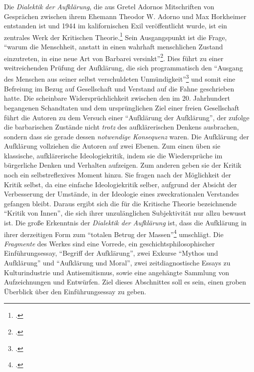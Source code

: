 \documentclass[a4paper, 12pt]{article}
\begin{document}
\begin{onehalfspace}
\noindent Die \emph{Dialektik der Aufklärung}, die aus Gretel Adornos Mitschriften von Gesprächen zwischen ihrem Ehemann Theodor W. Adorno und Max Horkheimer entstanden ist und 1944 im kalifornischen Exil veröffentlicht wurde, ist ein zentrales Werk der Kritischen Theorie.\footnote{\Cite[Vgl.][S. 249]{jaeggi}.} Sein Ausgangspunkt ist die Frage, "`warum die Menschheit, anstatt in einen wahrhaft menschlichen Zustand einzutreten, in eine neue Art von Barbarei versinkt"'\footnote{\Cite[Siehe][S. 1]{dialektik-der-aufklaerung}.}. Dies führt zu einer weitreichenden Prüfung der Aufklärung, die sich programmatisch den "`Ausgang des Menschen aus seiner selbst verschuldeten Unmündigkeit"'\footnote{\Cite[Siehe][S. 481]{kant}.} und somit eine Befreiung im Bezug auf Gesellschaft und Verstand auf die Fahne geschrieben hatte. Die scheinbare Widersprüchlichkeit zwischen den im 20. Jahrhundert begangenen Schandtaten und dem ursprünglichen Ziel einer freien Gesellschaft führt die Autoren zu dem Versuch einer "`Aufklärung der Aufklärung"', der zufolge die barbarischen Zustände nicht \emph{trotz} des aufklärerischen Denkens ausbrachen, sondern dass sie gerade dessen \emph{notwendige Konsequenz} waren. Die Aufklärung der Aufklärung vollziehen die Autoren auf zwei Ebenen. Zum einen üben sie klassische, aufklärerische Ideologiekritik, indem sie die Wiedersprüche im bürgerliche Denken und Verhalten aufzeigen. Zum anderen geben sie der Kritik noch ein selbstreflexives Moment hinzu. Sie fragen nach der Möglichkeit der Kritik selbst, da eine einfache Ideologiekritik selber, aufgrund der Absicht der Verbesserung der Umstände, in der Ideologie eines zweckrationalen Verstandes gefangen bleibt. Daraus ergibt sich die für die Kritische Theorie bezeichnende "`Kritik von Innen"', die sich ihrer unzulänglichen Subjektivität nur allzu bewusst ist. Die große Erkenntnis der \emph{Dialektik der Aufklärung} ist, dass die Aufklärung in ihrer derzeitigen Form zum "`totalen Betrug der Massen"'\footnote{\Cite[Siehe][S. 49]{dialektik-der-aufklaerung}.} umschlägt. Die \emph{Fragmente} des Werkes sind eine Vorrede, ein geschichtsphilosophischer Einführungsessay, "`Begriff der Aufklärung"', zwei Exkurse "`Mythos und Aufklärung"' und "`Aufklärung und Moral"', zwei zeitdiagnostische Essays zu Kulturindustrie und Antisemitismus, sowie eine angehängte Sammlung von Aufzeichnungen und Entwürfen. Ziel dieses Abschnittes soll es sein, einen groben Überblick über den Einführungsessay zu geben.  


\end{onehalfspace}
\end{document}
